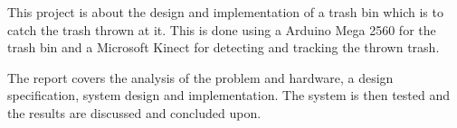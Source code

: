 This project is about the design and implementation of a trash bin which is to catch the trash thrown at it. This is done using a Arduino Mega 2560 for the trash bin and a Microsoft Kinect for detecting and tracking the thrown trash. 
\newline

The report covers the analysis of the problem and hardware, a design specification, system design and implementation. The system is then tested and the results are discussed and concluded upon. 
\newline



